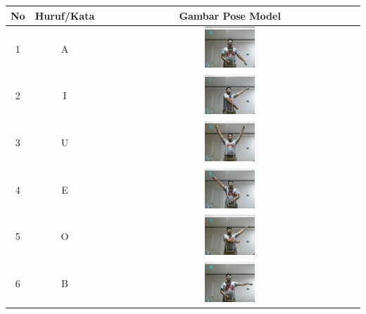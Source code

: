 		\begin{table}[h]
			\centering
			\label{tbl:Tabel Contoh Huruf/Kata dan Gambar Pose Model CNN Xception Orang Pertama}
			\begin{tabular}{|c|c|c|}
			\hline
			No & Huruf/Kata & Gambar Pose Model  \\
			\hline
			1 & A & \includegraphics[width=0.2\textwidth]{gambar/bener/HurufA_ModelCNNXception_Dawe.png} \\
			\hline
			2 & I & \includegraphics[width=0.2\textwidth]{gambar/bener/HurufI_ModelCNNXception_Dawe.png} \\
			\hline
			3 & U & \includegraphics[width=0.2\textwidth]{gambar/bener/HurufU_ModelCNNXception_Dawe.png} \\
			\hline
			4 & E & \includegraphics[width=0.2\textwidth]{gambar/bener/HurufE_ModelCNNXception_Dawe.png} \\
			\hline
			5 & O & \includegraphics[width=0.2\textwidth]{gambar/bener/HurufO_ModelCNNXception_Dawe.png} \\
			\hline
			6 & B & \includegraphics[width=0.2\textwidth]{gambar/bener/HurufB_ModelCNNXception_Dawe.png} \\

\end{tabular}
\end{table}
